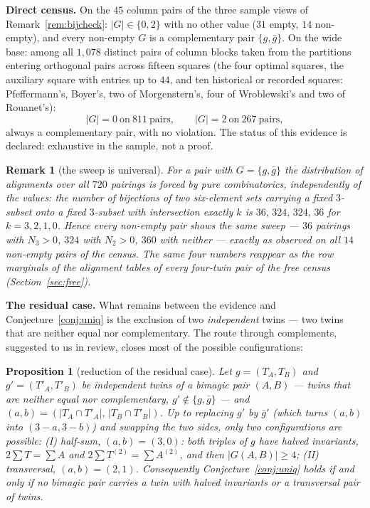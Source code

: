 \documentclass[11pt]{article}
\newtheorem{proposition}[theorem]{Proposition}
\newtheorem{remark}[theorem]{Remark}
\begin{document}
\textbf{Direct census.} On the $45$ column pairs of the three sample
views of Remark~\ref{rem:bijcheck}: $|G|\in\{0,2\}$ with no other
value ($31$ empty, $14$ non-empty), and every non-empty $G$ is a
complementary pair $\{g,\bar g\}$. On the wide base: among all
$1{,}078$ distinct pairs of column blocks taken from the partitions
entering orthogonal pairs across fifteen squares (the four optimal
squares, the auxiliary square with entries up to $44$, and ten
historical or recorded squares: Pfeffermann's, Boyer's, two of
Morgenstern's, four of Wroblewski's and two of Rouanet's):
\[
|G|=0\ \text{on}\ 811\ \text{pairs},\qquad
|G|=2\ \text{on}\ 267\ \text{pairs},
\]
always a complementary pair, with no violation. The status of this
evidence is declared: exhaustive in the sample, not a proof.

\begin{remark}[the sweep is universal]\label{rem:sweep}
For a pair with $G=\{g,\bar g\}$ the distribution of alignments over
all $720$ pairings is forced by pure combinatorics, independently of
the values: the number of bijections of two six-element sets carrying
a fixed $3$-subset onto a fixed $3$-subset with intersection exactly
$k$ is $36,\,324,\,324,\,36$ for $k=3,2,1,0$. Hence every non-empty
pair shows the same sweep --- $36$ pairings with $N_3>0$, $324$ with
$N_2>0$, $360$ with neither --- exactly as observed on all $14$
non-empty pairs of the census. The same four numbers reappear as the
row marginals of the alignment tables of every four-twin pair of the
free census (Section~\ref{sec:free}).
\end{remark}

\textbf{The residual case.} What remains between the evidence and
Conjecture~\ref{conj:uniq} is the exclusion of two \emph{independent}
twins --- two twins that are neither equal nor complementary. The
route through complements, suggested to us in review, closes most of
the possible configurations:

\begin{proposition}[reduction of the residual case]\label{prop:reduction}
Let $g=(T_A,T_B)$ and $g'=(T'_A,T'_B)$ be \emph{independent} twins of
a bimagic pair $(A,B)$ --- twins that are neither equal nor
complementary, $g'\notin\{g,\bar g\}$ --- and
$(a,b)=(|T_A\cap T'_A|,\,|T_B\cap T'_B|)$.
Up to replacing $g'$ by $\bar g'$ (which turns $(a,b)$ into
$(3-a,3-b)$) and swapping the two sides, only two configurations are
possible:
\emph{(I) half-sum}, $(a,b)=(3,0)$: both triples of $g$ have halved
invariants, $2\sum T=\sum A$ and $2\sum T^{(2)}=\sum A^{(2)}$, and
then $|G(A,B)|\ge 4$;
\emph{(II) transversal}, $(a,b)=(2,1)$.
Consequently Conjecture~\ref{conj:uniq} holds if and only if no
bimagic pair carries a twin with halved invariants or a transversal
pair of twins.
\end{proposition}
\end{document}
